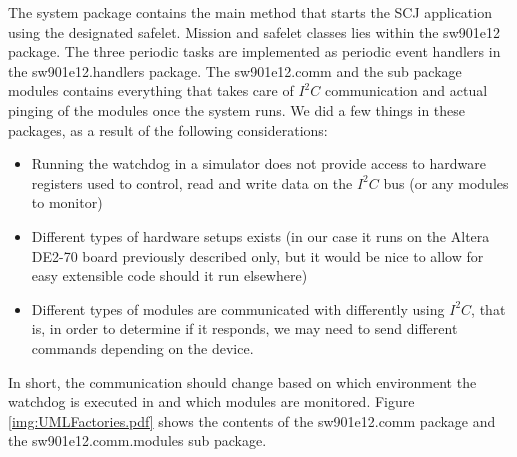 The system package contains the main method that starts the SCJ application using the designated safelet. Mission and safelet classes lies within the sw901e12 package. The three periodic tasks are implemented as periodic event handlers in the sw901e12.handlers package.
The sw901e12.comm and the sub package modules contains everything that takes care of $\textit{I}^2\textit{C}$ communication and actual pinging of the modules once the system runs. We did a few things in these packages, as a result of the following considerations:
\begin{itemize}
    \item Running the watchdog in a simulator does not provide access to hardware registers used to control, read and write data on the $\textit{I}^2\textit{C}$ bus (or any modules to monitor)
    \item Different types of hardware setups exists (in our case it runs on the Altera DE2-70 board previously described only, but it would be nice to allow for easy extensible code should it run elsewhere)
    \item Different types of modules are communicated with differently using $\textit{I}^2\textit{C}$, that is, in order to determine if it responds, we may need to send different commands depending on the device.
\end{itemize}

In short, the communication should change based on which environment the watchdog is executed in and which modules are monitored. Figure \ref{img:UMLFactories.pdf} shows the contents of the sw901e12.comm package and the sw901e12.comm.modules sub package.

